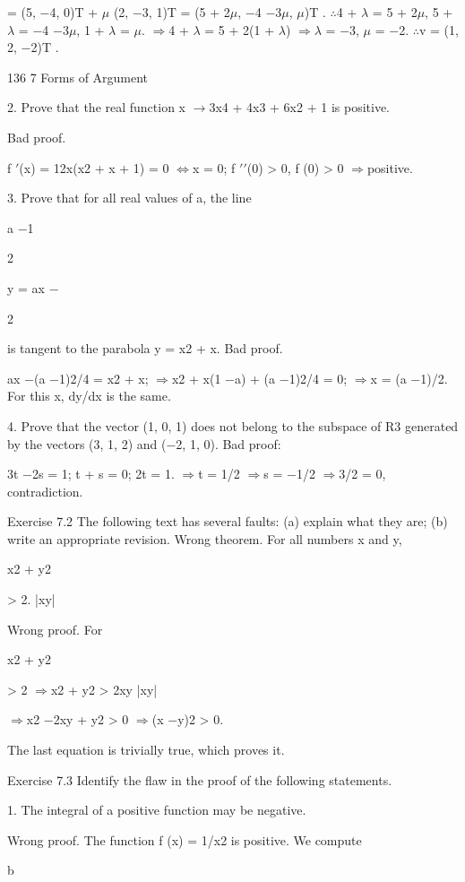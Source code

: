 \documentclass[11pt]{article}
\theoremstyle{plain}
\theoremstyle{definition}
\begin{document}
= (5, $-$4, 0)T + $\mu$ (2, $-$3, 1)T = (5 + 2$\mu$, $-$4 $-$3$\mu$, $\mu$)T . $\therefore$4 + $\lambda$ = 5 + 2$\mu$, 5 + $\lambda$ = $-$4 $-$3$\mu$, 1 + $\lambda$ = $\mu$. $\Rightarrow$4 + $\lambda$ = 5 + 2(1 + $\lambda$) $\Rightarrow$$\lambda$ = $-$3, $\mu$ = $-$2. $\therefore$v = (1, 2, $-$2)T . 

136 7 Forms of Argument

2. Prove that the real function x $\to$3x4 + 4x3 + 6x2 + 1 is positive.

Bad proof.

f $'$(x) = 12x(x2 + x + 1) = 0 $\Leftrightarrow$x = 0; f $'$$'$(0) > 0, f (0) > 0 $\Rightarrow$positive. 

3. Prove that for all real values of a, the line

a $-$1

2

y = ax $-$

2

is tangent to the parabola y = x2 + x. Bad proof.

ax $-$(a $-$1)2/4 = x2 + x; $\Rightarrow$x2 + x(1 $-$a) + (a $-$1)2/4 = 0; $\Rightarrow$x = (a $-$1)/2. For this x, dy/dx is the same. 

4. Prove that the vector (1, 0, 1) does not belong to the subspace of R3 generated by the vectors (3, 1, 2) and ($-$2, 1, 0). Bad proof:

3t $-$2s = 1; t + s = 0; 2t = 1. $\Rightarrow$t = 1/2 $\Rightarrow$s = $-$1/2 $\Rightarrow$3/2 = 0, contradiction. 

Exercise 7.2 The following text has several faults: (a) explain what they are; (b) write an appropriate revision. Wrong theorem. For all numbers x and y,

x2 + y2

> 2. |xy|

Wrong proof. For

x2 + y2

> 2 $\Rightarrow$x2 + y2 > 2xy |xy|

$\Rightarrow$x2 $-$2xy + y2 > 0 $\Rightarrow$(x $-$y)2 > 0.

The last equation is trivially true, which proves it. 

Exercise 7.3 Identify the flaw in the proof of the following statements.

1. The integral of a positive function may be negative.

Wrong proof. The function f (x) = 1/x2 is positive. We compute

b
\end{document}

